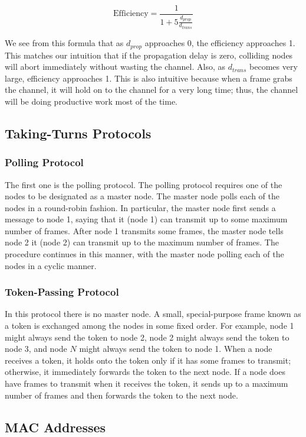 \documentclass[11pt]{article}
\begin{document}
\[
	\mathrm{Efficiency} = \frac{1}{1 + 5 \frac{d_{prop}}{d_{trans}}}
\]

We see from this formula that as $d_{prop}$ approaches 0, the efficiency approaches 1. This matches our intuition that if the propagation delay is zero, colliding nodes will abort immediately without wasting the channel. Also, as $d_{trans}$ becomes very large, efficiency approaches 1. This is also intuitive because when a frame grabs the channel, it will hold on to the channel for a very long time; thus, the channel will be doing productive work most of the time.

\subsection{Taking-Turns Protocols}

\subsubsection{Polling Protocol}

The first one is the polling protocol. The polling protocol requires one of the nodes to be designated as a master node. The master node polls each of the nodes in a round-robin fashion. In particular, the master node first sends a message to node 1, saying that it (node 1) can transmit up to some maximum number of frames. After node 1 transmits some frames, the master node tells node 2 it (node 2) can transmit up to the maximum number of frames. The procedure continues in this manner, with the master node polling each of the nodes in a cyclic manner.

\subsubsection{Token-Passing Protocol}

In this protocol there is no master node. A small, special-purpose frame known as a token is exchanged among the nodes in some fixed order. For example, node 1 might always send the token to node 2, node 2 might always send the token to node 3, and node $N$ might always send the token to node 1. When a node receives a token, it holds onto the token only if it has some frames to transmit; otherwise, it immediately forwards the token to the next node. If a node does have frames to transmit when it receives the token, it sends up to a maximum number of frames and then forwards the token to the next node. 

\subsection{MAC Addresses}
\end{document}

